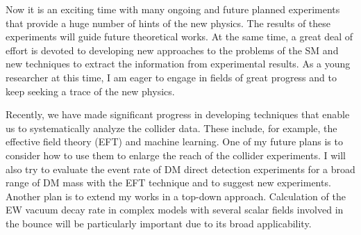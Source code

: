 \documentclass[12pt,notitlepage]{article}
\begin{document}

Now it is an exciting time with many ongoing and future planned experiments that provide a huge number of hints of the new physics.
The results of these experiments will guide future theoretical works.
At the same time, a great deal of effort is devoted to developing new approaches to the problems of the SM and new techniques to extract the information from experimental results.
As a young researcher at this time, I am eager to engage in fields of great progress and to keep seeking a trace of the new physics.

Recently, we have made significant progress in developing techniques that enable us to systematically analyze the collider data.
These include, for example, the effective field theory (EFT) and machine learning.
One of my future plans is to consider how to use them to enlarge the reach of the collider experiments.
I will also try to evaluate the event rate of DM direct detection experiments for a broad range of DM mass with the EFT technique and to suggest new experiments.
Another plan is to extend my works in a top-down approach.
Calculation of the EW vacuum decay rate in complex models with several scalar fields involved in the bounce will be particularly important due to its broad applicability.
\end{document}
